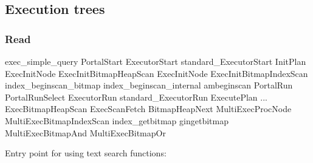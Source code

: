 \documentclass[11pt]{article}
\begin{document}
\hypertarget{execution-trees}{%
\subsection{Execution trees}\label{execution-trees}}

\hypertarget{read}{%
\subsubsection{Read}\label{read}}

\begin{textcode}
exec_simple_query
  PortalStart
    ExecutorStart
      standard_ExecutorStart
        InitPlan
          ExecInitNode
            ExecInitBitmapHeapScan
              ExecInitNode
                ExecInitBitmapIndexScan
                  index_beginscan_bitmap
                    index_beginscan_internal
                      ambeginscan
  PortalRun
    PortalRunSelect
      ExecutorRun
        standard_ExecutorRun
          ExecutePlan
            ... ExecBitmapHeapScan
              ExecScanFetch
                BitmapHeapNext
                  MultiExecProcNode
                    MultiExecBitmapIndexScan
                      index_getbitmap
                        gingetbitmap
                    MultiExecBitmapAnd
                    MultiExecBitmapOr
\end{textcode}

Entry point for using text search functions:
\end{document}
